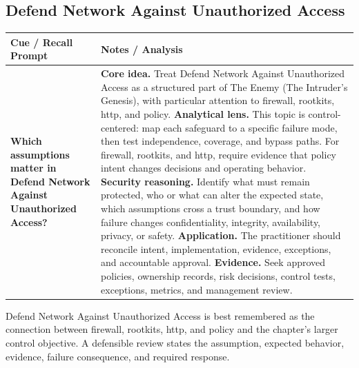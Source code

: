 \documentclass[11pt]{article}
\newcommand{\CornellHeader}{%
\rowcolor{Navy}\color{white}\bfseries Cue / Recall Prompt & \color{white}\bfseries Notes / Analysis\\\hline}
\newcommand{\CornellRow}[2]{%
\cellcolor{CueGray}\RaggedRight\textbf{#1} & \RaggedRight #2\\\hline}
\begin{document}
\subsection*{Defend Network Against Unauthorized Access}
\begin{longtable}{>{\RaggedRight\arraybackslash}p{}|>{\RaggedRight\arraybackslash}p{}}
\CornellHeader
\CornellRow{Which assumptions matter in Defend Network Against Unauthorized Access?}{\textbf{Core idea.} Treat Defend Network Against Unauthorized Access as a structured part of The Enemy (The Intruder's Genesis), with particular attention to firewall, rootkits, http, and policy. \textbf{Analytical lens.} This topic is control-centered: map each safeguard to a specific failure mode, then test independence, coverage, and bypass paths. For firewall, rootkits, and http, require evidence that policy intent changes decisions and operating behavior. \textbf{Security reasoning.} Identify what must remain protected, who or what can alter the expected state, which assumptions cross a trust boundary, and how failure changes confidentiality, integrity, availability, privacy, or safety. \textbf{Application.} The practitioner should reconcile intent, implementation, evidence, exceptions, and accountable approval. \textbf{Evidence.} Seek approved policies, ownership records, risk decisions, control tests, exceptions, metrics, and management review.}
\end{longtable}
\begin{topicsummary}
Defend Network Against Unauthorized Access is best remembered as the connection between firewall, rootkits, http, and policy and the chapter's larger control objective. A defensible review states the assumption, expected behavior, evidence, failure consequence, and required response.
\end{topicsummary}
\end{document}
